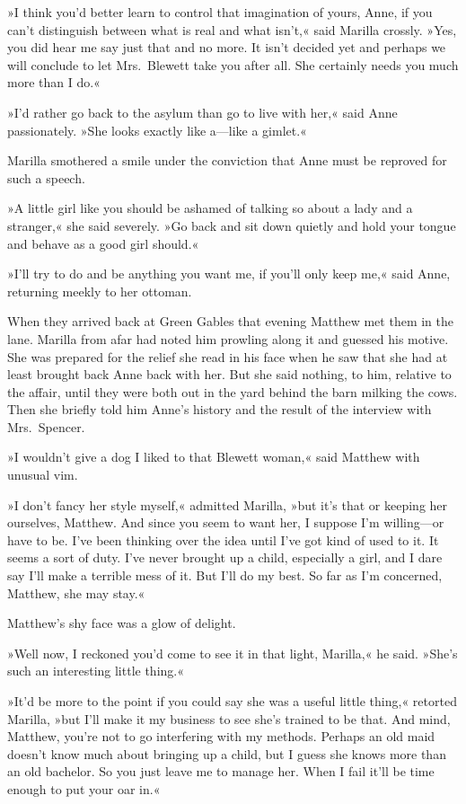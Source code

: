»I think you'd better learn to control that imagination of yours, Anne, if you can't distinguish between what is real and what isn't,« said Marilla crossly. »Yes, you did hear me say just that and no more. It isn't decided yet and perhaps we will conclude to let Mrs.~Blewett take you after all. She certainly needs you much more than I do.«

»I'd rather go back to the asylum than go to live with her,« said Anne passionately. »She looks exactly like a—like a gimlet.«

Marilla smothered a smile under the conviction that Anne must be reproved for such a speech.

»A little girl like you should be ashamed of talking so about a lady and a stranger,« she said severely. »Go back and sit down quietly and hold your tongue and behave as a good girl should.«

»I'll try to do and be anything you want me, if you'll only keep me,« said Anne, returning meekly to her ottoman.

When they arrived back at Green Gables that evening Matthew met them in the lane. Marilla from afar had noted him prowling along it and guessed his motive. She was prepared for the relief she read in his face when he saw that she had at least brought back Anne back with her. But she said nothing, to him, relative to the affair, until they were both out in the yard behind the barn milking the cows. Then she briefly told him Anne's history and the result of the interview with Mrs.~Spencer.

»I wouldn't give a dog I liked to that Blewett woman,« said Matthew with unusual vim.

»I don't fancy her style myself,« admitted Marilla, »but it's that or keeping her ourselves, Matthew. And since you seem to want her, I suppose I'm willing—or have to be. I've been thinking over the idea until I've got kind of used to it. It seems a sort of duty. I've never brought up a child, especially a girl, and I dare say I'll make a terrible mess of it. But I'll do my best. So far as I'm concerned, Matthew, she may stay.«

Matthew's shy face was a glow of delight.

»Well now, I reckoned you'd come to see it in that light, Marilla,« he said. »She's such an interesting little thing.«

»It'd be more to the point if you could say she was a useful little thing,« retorted Marilla, »but I'll make it my business to see she's trained to be that. And mind, Matthew, you're not to go interfering with my methods. Perhaps an old maid doesn't know much about bringing up a child, but I guess she knows more than an old bachelor. So you just leave me to manage her. When I fail it'll be time enough to put your oar in.«

